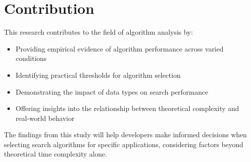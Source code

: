 \section{Contribution}

This research contributes to the field of algorithm analysis by:

\begin{itemize}
    \item Providing empirical evidence of algorithm performance across varied conditions
    \item Identifying practical thresholds for algorithm selection
    \item Demonstrating the impact of data types on search performance
    \item Offering insights into the relationship between theoretical complexity and real-world behavior
\end{itemize}

The findings from this study will help developers make informed decisions when selecting search algorithms for specific applications, considering factors beyond theoretical time complexity alone.